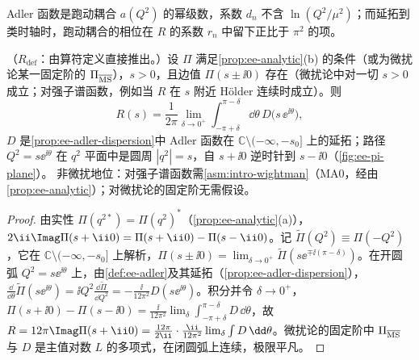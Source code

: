 Adler 函数是跑动耦合 $a(Q^2)$ 的幂级数，系数 $d_n$ 不含 $\ln(Q^2/\mu^2)$；而延拓到类时轴时，跑动耦合的相位在 $R$ 的系数 $r_n$ 中留下正比于 $\pi^2$ 的项。

\begin{proposition}\label{prop:ee-contour}
（$R_{\mathrm{def}}$：由算符定义直接推出。）设 $\Pi$ 满足\cref{prop:ee-analytic}(b) 的条件（或为微扰论某一固定阶的 $\Pi_{\overline{\rm MS}}$），$s>0$，且边值 $\Pi(s\pm\ii0)$ 存在（微扰论中对一切 $s>0$ 成立；对强子谱函数，例如当 $R$ 在 $s$ 附近 Hölder 连续时成立）。则
\begin{equation}\label{eq:ee-contour}
R(s)=\frac1{2\pi}\lim_{\delta\to0^+}\int_{-\pi+\delta}^{\pi-\delta}\!\dd\theta\,D\big(s\,\ee^{\ii\theta}\big),
\end{equation}
$D$ 是\cref{prop:ee-adler-dispersion}中 Adler 函数在 $\mathbb C\setminus(-\infty,-s_0]$ 上的延拓；路径 $Q^2=s\ee^{\ii\theta}$ 在 $q^2$ 平面中是圆周 $|q^2|=s$，自 $s+\ii0$ 逆时针到 $s-\ii0$（\cref{fig:ee-pi-plane}）。
非微扰地位：对强子谱函数需\cref{asm:intro-wightman}（MA0，经由\cref{prop:ee-analytic}）；对微扰论的固定阶无需假设。
\end{proposition}
\begin{proof}
由实性 $\Pi(q^{2*})=\Pi(q^2)^*$（\cref{prop:ee-analytic}(a)），$2\ii\Imag\Pi(s+\ii0)=\Pi(s+\ii0)-\Pi(s-\ii0)$。记 $\tilde\Pi(Q^2)\equiv\Pi(-Q^2)$，它在 $\mathbb C\setminus(-\infty,-s_0]$ 上解析，$\Pi(s\pm\ii0)=\lim_{\delta\to0^+}\tilde\Pi(s\ee^{\mp\ii(\pi-\delta)})$。在开圆弧 $Q^2=s\ee^{\ii\theta}$ 上，由\cref{def:ee-adler}及其延拓（\cref{prop:ee-adler-dispersion}），$\frac{\dd}{\dd\theta}\tilde\Pi(s\ee^{\ii\theta})=\ii Q^2\frac{\dd\tilde\Pi}{\dd Q^2}=-\frac{\ii}{12\pi^2}D(s\ee^{\ii\theta})$。积分并令 $\delta\to0^+$，$\Pi(s+\ii0)-\Pi(s-\ii0)=\frac{\ii}{12\pi^2}\lim_\delta\int_{-\pi+\delta}^{\pi-\delta}D\,\dd\theta$，故 $R=12\pi\Imag\Pi(s+\ii0)=\frac{12\pi}{2\ii}\cdot\frac{\ii}{12\pi^2}\lim_\delta\int D\,\dd\theta$。微扰论的固定阶中 $\Pi_{\overline{\rm MS}}$ 与 $D$ 是主值对数 $L$ 的多项式，在闭圆弧上连续，极限平凡。
\end{proof}

